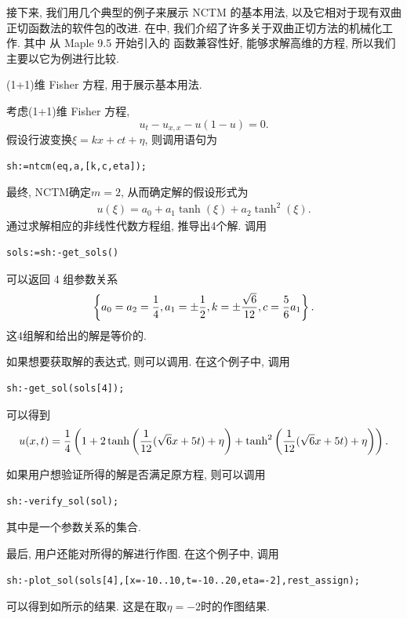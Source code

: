 接下来, 我们用几个典型的例子来展示 NCTM 的基本用法, 以及它相对于现有双曲正切函数法的软件包的改进. 在中, 我们介绍了许多关于双曲正切方法的机械化工作. 其中 从 Maple 9.5 开始引入的  函数兼容性好, 能够求解高维的方程, 所以我们主要以它为例进行比较. 

\begin{example}(1+1)维 Fisher 方程, 用于展示基本用法.

考虑(1+1)维 Fisher 方程\cite{guo1991analytic},
\begin{equation}
    u_t-u_{x,x}-u(1-u)=0.
\end{equation}
假设行波变换$\xi=kx+ct+\eta$, 则调用语句为
\begin{verbatim}
sh:=ntcm(eq,a,[k,c,eta]);
\end{verbatim}
最终, NCTM确定$m=2$, 从而确定解的假设形式为 
\begin{eqnarray}
    u(\xi)=a_0+a_1 \tanh(\xi)+a_2\tanh^2(\xi).
\end{eqnarray}
通过求解相应的非线性代数方程组, 推导出4个解. 调用 
\begin{verbatim}
sols:=sh:-get_sols()
\end{verbatim}
可以返回 4 组参数关系
\begin{equation}
    \left\{a_0=a_2=\frac{1}{4},a_1=\pm \frac{1}{2},k=\pm \frac{\sqrt 6}{12},c=\frac{5}{6}a_1\right\}. \label{para-rel}
\end{equation}
这4组解和给出的解是等价的.

如果想要获取解的表达式, 则可以调用. 在这个例子中, 调用
\begin{verbatim}
sh:-get_sol(sols[4]);
\end{verbatim}
可以得到
\begin{equation}
    u(x,t)=\frac{1}{4}\left(1+2\tanh\left(\frac{1}{12}(\sqrt{6}x+5t)+\eta\right)+\tanh^2\left(\frac{1}{12}(\sqrt{6}x+5t)+\eta\right)\right). \label{fisher-sol-4}
\end{equation}

如果用户想验证所得的解是否满足原方程, 则可以调用
\begin{verbatim}
sh:-verify_sol(sol);
\end{verbatim}
其中是一个参数关系的集合.

最后, 用户还能对所得的解进行作图. 在这个例子中, 调用
\begin{verbatim}
sh:-plot_sol(sols[4],[x=-10..10,t=-10..20,eta=-2],rest_assign);
\end{verbatim}
可以得到如所示的结果. 这是在取$\eta=-2$时的作图结果. 


\end{example}
